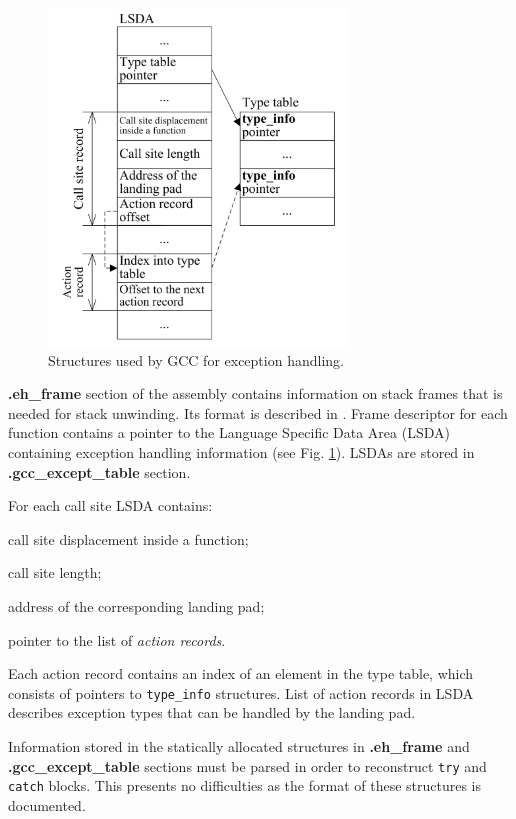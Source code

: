 \documentclass[times, 10pt,twocolumn]{article}
\renewcommand{\~}{{\raise.35ex\hbox{$\scriptstyle\sim$}}}
\renewenvironment{itemize}{
    \begin{list}{\labelitemi}{\itemsep=-\parsep}
}{
	\end{list}
}
\begin{document}
\begin{figure}[tb!]
\centering
  \includegraphics[width=8.0cm]{images/gcce}
\caption{Structures used by GCC for exception handling.}
\label{fig:gcce}
\end{figure}

\textbf{.eh\_frame} section of the assembly contains information on stack frames
that is needed for stack unwinding. Its format is described in \cite{linuxspec}.
Frame descriptor for each function contains a pointer to the
Language Specific Data Area (LSDA) containing exception handling information (see Fig. \ref{fig:gcce}).
LSDAs are stored in \textbf{.gcc\_except\_table}
section.

For each call site LSDA contains:
\begin{itemize}
\item call site displacement inside a function;
\item call site length;
\item address of the corresponding landing pad;
\item pointer to the list of \textit{action records}.
\end{itemize}

Each action record contains an index of an element in the type table, which
consists of pointers to \lstinline{type_info} structures.
List of action records in LSDA describes
exception types that can be handled by the landing pad.

Information stored in the statically allocated structures in
\textbf{.eh\_frame} and \textbf{.gcc\_except\_table} sections must be
parsed in order to reconstruct \lstinline{try} and \lstinline{catch}
blocks.
This presents no difficulties as the format of these structures
is documented.
\end{document}
